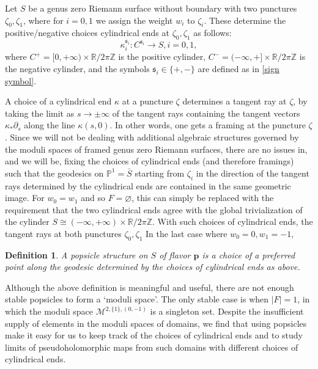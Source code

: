 \documentclass[11pt]{amsproc}
\def\Z{{\mathbb Z}}
\def\R{{\mathbb R}}
\def\P{{\mathbb P}}
\def\k{\kappa}
\def\M{\mathcal{M}}
\def\p{\partial}
\def\sk{\mathfrak{s}}
\newtheorem{defn}[lem]{Definition}
\theoremstyle{remark}
\numberwithin{equation}{section}
\begin{document}
Let $S$ be a genus zero Riemann surface without boundary with two punctures $\zeta_{0}, \zeta_{1}$,
where for $i=0, 1$ we assign the weight $w_{i}$ to $\zeta_{i}$.
These determine the positive/negative choices cylindrical ends at $\zeta_{0}, \zeta_{1}$ as follows:
\begin{equation}
\k_{i}^{\sk_{i}}: C^{\sk_{i}} \to S, i = 0, 1,
\end{equation}
where $C^{+} = [0, +\infty) \times \R/2\pi\Z$ is the positive cylinder, $C^{-} = (-\infty, +] \times \R/2\pi\Z$ is the negative cylinder,
and the symbols $\sk_{i} \in \{+, -\}$ are defined as in \eqref{sign symbol}.

A choice of a cylindrical end $\k$ at a puncture $\zeta$ determines a tangent ray at $\zeta$,
by taking the limit as $s \to \pm \infty$ of the tangent rays containing the tangent vectors $\k_{*}\p_{s}$ along the line $\k(s, 0)$.
In other words, one gets a framing at the puncture $\zeta$.
Since we will not be dealing with additional algebraic structures governed by the moduli spaces of framed genus zero Riemann surfaces,
there are no issues in, and we will be, fixing the choices of cylindrical ends (and therefore framings) such that the geodesics on $\P^{1} = \bar{S}$ starting from $\zeta_{i}$ in the direction of the tangent rays determined by the cylindrical ends are contained in the same geometric image.
For $w_{0} = w_{1}$ and so $F=\varnothing$, this can simply be replaced with the requirement that the two cylindrical ends agree with the global trivialization of the cylinder $S \cong (-\infty, +\infty) \times \R/2\pi\Z$.
With such choices of cylindrical ends,
the tangent rays at both punctures $\zeta_{0}, \zeta_{1}$ 
In the last case where $w_{0} = 0, w_{1} = -1$, 


\begin{defn}
A popsicle structure on $S$ of flavor $\mathbf{p}$ is a choice of a preferred point along the geodesic determined by the choices of cylindrical ends as above.
\end{defn}

Although the above definition is meaningful and useful,
there are not enough stable popsicles to form a `moduli space'.
The only stable case is when $|F|=1$, in which the moduli space $\M^{2, \{1\}, (0, -1)}$ is a singleton set.
Despite the insufficient supply of elements in the moduli spaces of domains,
we find that using popsicles make it easy for us to keep track of the choices of cylindrical ends and to study limits of pseudoholomorphic maps from such domains with different choices of cylindrical ends.
\end{document}

